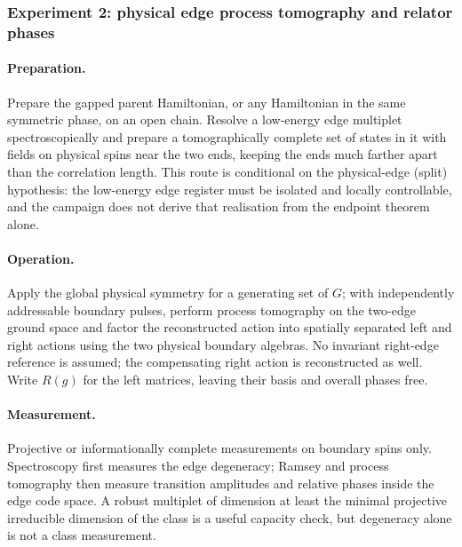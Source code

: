 \subsubsection*{Experiment 2: physical edge process tomography and relator
phases}

\paragraph{Preparation.} Prepare the gapped parent Hamiltonian, or any
Hamiltonian in the same symmetric phase, on an open chain. Resolve a
low-energy edge multiplet spectroscopically and prepare a tomographically
complete set of states in it with fields on physical spins near the two ends,
keeping the ends much farther apart than the correlation length. This route is
conditional on the physical-edge (split) hypothesis: the low-energy edge
register must be isolated and locally controllable, and the campaign does not
derive that realisation from the endpoint theorem alone.

\paragraph{Operation.} Apply the global physical symmetry for a generating set
of $G$; with independently addressable boundary pulses, perform process
tomography on the two-edge ground space and factor the reconstructed action
into spatially separated left and right actions using the two physical
boundary algebras. No invariant right-edge reference is assumed; the
compensating right action is reconstructed as well. Write $R(g)$ for the left
matrices, leaving their basis and overall phases free.

\paragraph{Measurement.} Projective or informationally complete measurements on
boundary spins only. Spectroscopy first measures the edge degeneracy; Ramsey
and process tomography then measure transition amplitudes and relative phases
inside the edge code space. A robust multiplet of dimension at least the
minimal projective irreducible dimension of the class is a useful capacity
check, but degeneracy alone is not a class measurement.

